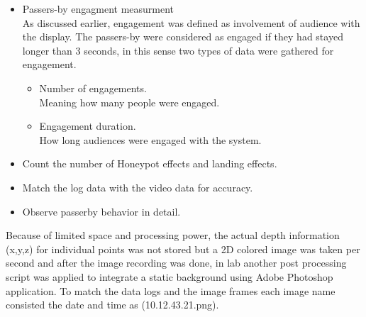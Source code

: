 \begin{enumerate}
\begin{itemize}

\item Passers-by engagment measurment \\
As discussed earlier, engagement was defined as involvement of audience with the display. The passers-by were considered as engaged if they had stayed longer than 3 seconds, in this sense two types of data were gathered for engagement.

        \begin{itemize}
        \item Number of engagements. \\
        Meaning how many people were engaged.

        \item Engagement duration. \\
        How long audiences were engaged with the system.

        \end{itemize}

\item Count the number of Honeypot effects and landing effects.
\item Match the log data with the video data for accuracy.
\item Observe passerby behavior in detail.
\end{itemize}

Because of limited space and processing power, the actual depth information (x,y,z) for individual points was not stored but a 2D colored image was taken per second and after the image recording was done, in lab another post processing script was applied to integrate a static background using Adobe Photoshop application. To match the data logs and the image frames each image name consisted the date and time as (10.12.43.21.png).



\end{enumerate}
